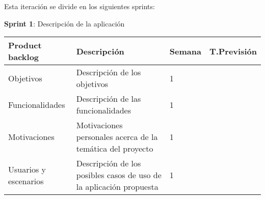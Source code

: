 Esta iteración se divide en los siguientes sprints:

\textbf{Sprint 1}: Descripción de la aplicación







\begin{table}[]
\begin{tabular}{|p{4cm}|p{7cm}|p{1.5cm}|p{2.5cm}|}
\hline
\rowcolor[HTML]{000000} 
{\color[HTML]{FFFFFF} Product backlog} & {\color[HTML]{FFFFFF} Descripción}                                  & {\color[HTML]{FFFFFF} Semana} & {\color[HTML]{FFFFFF} T.Previsión} \\ \hline
Objetivos                              & Descripción de los objetivos                                        & 1                             &                                        \\ \hline
Funcionalidades                        & Descripción de las funcionalidades                                  & 1                             &                                        \\ \hline
Motivaciones                           & Motivaciones personales acerca de la temática del proyecto          & 1                             &                                        \\ \hline
Usuarios y escenarios                  & Descripción de los posibles casos de uso de la aplicación propuesta & 1                             &                                        \\ \hline
\end{tabular}
\end{table}




